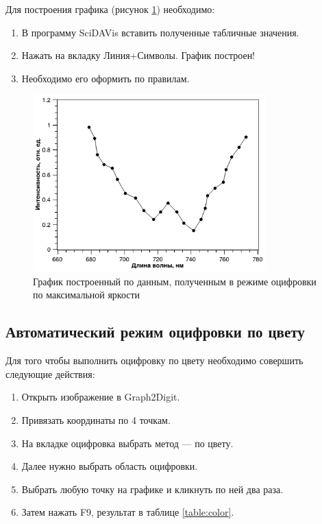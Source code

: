 \documentclass[a4paper,14pt,russian]{report}
\begin{document}
Для построения графика (рисунок \ref{graph:brightness}) необходимо:

\begin{enumerate}
  \item В программу SciDAVis вставить полученные табличные значения.
  \item Нажать на вкладку Линия+Символы. График построен!
  \item Необходимо его оформить по правилам.
\end{enumerate}

\begin{figure}[!htb]
  \centerline{\includegraphics[width=0.8\textwidth]{graph-brightness}}
  \caption{График построенный по данным, полученным в режиме оцифровки по максимальной яркости}
  \label{graph:brightness}
\end{figure}

\subsection{Автоматический режим оцифровки по цвету}

Для того чтобы выполнить оцифровку по цвету необходимо совершить следующие действия:

\begin{enumerate}
  \item Открыть изображение в Graph2Digit.
  \item Привязать координаты по 4 точкам.
  \item На вкладке оцифровка выбрать метод — по цвету.
  \item Далее нужно выбрать область оцифровки.
  \item Выбрать любую точку на графике и кликнуть по ней два раза.
  \item Затем нажать F9, результат в таблице \ref{table:color}.
\end{enumerate}
\end{document}
